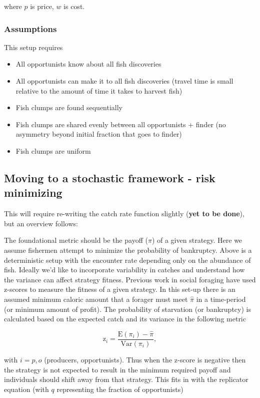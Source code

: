 \documentclass[11pt]{article}
\begin{document}
where $p$ is price, $w$ is cost. 

\subsubsection*{Assumptions}

This setup requires

\begin{itemize}
\itemsep1pt\parskip0pt
\item
  All opportunists know about all fish discoveries
\item
  All opportunists can make it to all fish discoveries (travel time is small relative to the amount of time it takes to harvest fish)
\item
  Fish clumps are found sequentially
\item
  Fish clumps are shared evenly between all opportunists + finder (no asymmetry beyond initial fraction that goes to finder)
\item
  Fish clumps are uniform
\end{itemize}

\subsection*{Moving to a stochastic framework - risk minimizing}

This will require re-writing the catch rate function slightly (\textbf{yet to be done}), but an overview follows:

The foundational metric should be the payoff ($\pi$) of a given strategy. Here we assume fishermen attempt to minimize the probability of bankruptcy. Above is a deterministic setup with the encounter rate depending only on the abundance of fish. Ideally we'd like to incorporate variability in catches and understand how the variance can affect strategy fitness. Previous work in social foraging have used z-scores to measure the fitness of a given strategy. In this set-up there is an assumed minimum caloric amount that a forager must meet $\hat{\pi}$ in a time-period (or minimum amount of profit). The probability of starvation (or bankruptcy) is calculated based on the expected catch and its variance in the following metric

\begin{equation}
\text{z}_i = \frac{\text{E}(\pi_i)-\hat{\pi}}{\text{Var}(\pi_i)},
\end{equation}

with $i = p, o$ (producers, opportunists). Thus when the z-score is negative then the strategy is not expected to result in the minimum required payoff and individuals should shift away from that strategy. This fits in with the replicator equation (with $q$ representing the fraction of opportunists)
\end{document}
